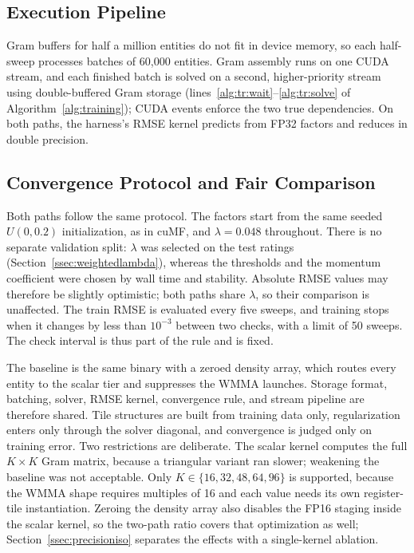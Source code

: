 \subsection{Execution Pipeline}
\label{ssec:pipeline}

Gram buffers for half a million entities do not fit in device memory, so each half-sweep processes batches of 60{,}000 entities. Gram assembly runs on one CUDA stream, and each finished batch is solved on a second, higher-priority stream using double-buffered Gram storage (lines~\ref{alg:tr:wait}--\ref{alg:tr:solve} of Algorithm~\ref{alg:training}); CUDA events enforce the two true dependencies. On both paths, the harness's RMSE kernel predicts from FP32 factors and reduces in double precision.

\subsection{Convergence Protocol and Fair Comparison}
\label{ssec:protocol}

Both paths follow the same protocol. The factors start from the same seeded $U(0, 0.2)$ initialization, as in cuMF, and $\lambda = 0.048$ throughout. There is no separate validation split: $\lambda$ was selected on the test ratings (Section~\ref{ssec:weightedlambda}), whereas the thresholds and the momentum coefficient were chosen by wall time and stability. Absolute RMSE values may therefore be slightly optimistic; both paths share $\lambda$, so their comparison is unaffected. The train RMSE is evaluated every five sweeps, and training stops when it changes by less than $10^{-3}$ between two checks, with a limit of 50 sweeps. The check interval is thus part of the rule and is fixed.

The baseline is the same binary with a zeroed density array, which routes every entity to the scalar tier and suppresses the WMMA launches. Storage format, batching, solver, RMSE kernel, convergence rule, and stream pipeline are therefore shared. Tile structures are built from training data only, regularization enters only through the solver diagonal, and convergence is judged only on training error. Two restrictions are deliberate. The scalar kernel computes the full $K \times K$ Gram matrix, because a triangular variant ran slower; weakening the baseline was not acceptable. Only $K \in \{16, 32, 48, 64, 96\}$ is supported, because the WMMA shape requires multiples of 16 and each value needs its own register-tile instantiation. Zeroing the density array also disables the FP16 staging inside the scalar kernel, so the two-path ratio covers that optimization as well; Section~\ref{ssec:precisioniso} separates the effects with a single-kernel ablation.
